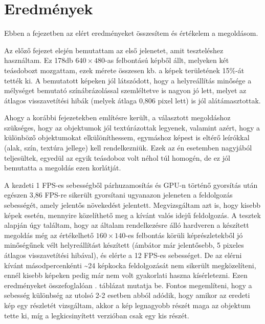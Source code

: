\chapter{Eredmények}

Ebben a fejezetben az elért eredményeket összesítem és értékelem a megoldásom.

Az előző fejezet elején bemutattam az első jelenetet, amit teszteléshez használtam. Ez 178db $640\times 480$-as felbontású képből állt, melyeken két teásdobozt mozgattam, ezek mérete összesen kb. a képek területének 15\%-át tették ki. A bemutatott képeken jól látszódott, hogy a helyreállítás minősége a mélységet bemutató színábrázolással szemléltetve is nagyon jó lett, melyet az átlagos visszavetítési hibák (melyek átlaga 0,806 pixel lett) is jól alátámasztottak.

Ahogy a korábbi fejezetekben említésre került, a választott megoldáshoz szükséges, hogy az objektumok jól textúrázottak legyenek, valamint azért, hogy a különböző objektumokat elkülöníthessem, egymáshoz képest is eltérő leírókkal (alak, szín, textúra jellege) kell rendelkezniük. Ezek az én esetemben nagyjából teljesültek, egyedül az egyik teásdoboz volt néhol túl homogén, de ez jól bemutatta a megoldás ezen korlátját.

A kezdeti 1 FPS-es sebességből párhuzamosítás és GPU-n történő gyorsítás után egészen 
3,86 FPS-re sikerült gyorsítani ugyanazon jeleneten a feldolgozás sebességét, amely jelentős növekedést jelentett. Megvizsgáltam azt is, hogy kisebb képek esetén, mennyire közelíthető meg a kívánt valós idejű feldolgozás. A tesztek alapján úgy találtam, hogy az általam rendelkezésre álló hardveren a készített megoldás még az értékelhető $160\times 140$-es felbontás körüli képrészletekből jó minőségűnek vélt helyreállítást készített (ámbátor már jelentősebb, 5 pixeles átlagos visszavetítési hibával), és elérte a 12 FPS-es sebességet. De az elérni kívánt másodpercenkénti \textasciitilde 24 képkocka feldolgozását nem sikerült megközelíteni, ennél kisebb képeken pedig már nem volt gyakorlati haszna kísérletezni. Ezen eredményeket összefoglalóan . táblázat mutatja be. Fontos megemlíteni, hogy a sebesség különbség az utolsó 2-2 esetben abból adódik, hogy amikor az eredeti kép egy részletét vizsgáltam, akkor a kép legnagyobb részét maga az objektum tette ki, míg a legkicsinyített verzióban csak egy kis részét.

